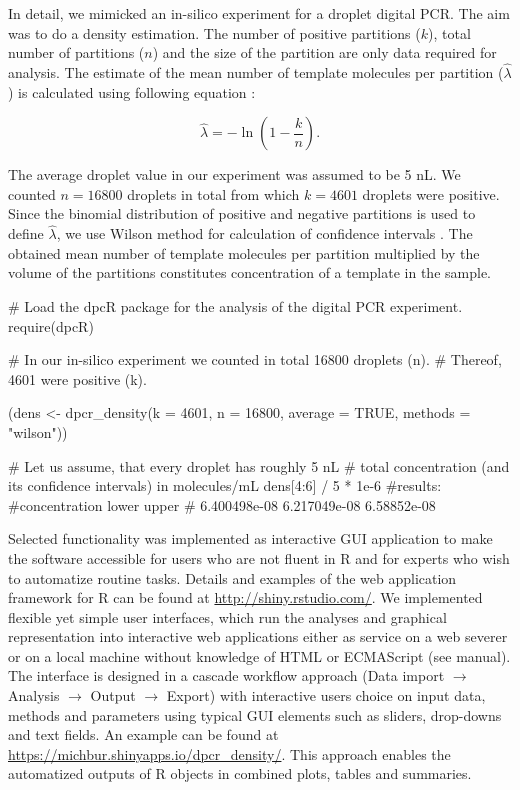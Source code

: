 In detail, we mimicked an in-silico experiment for a droplet digital PCR. The 
aim was to do a density 
estimation. The number of positive partitions ($k$), total number of partitions 
($n$) and 
the size of the partition are only data required for analysis. The estimate of 
the mean number of template molecules per partition ($\hat \lambda$) is 
calculated using following equation \citep{huggett_2013}:

\begin{equation}
\hat{\lambda} =  -\ln{(1 - \frac{k}{n})}.
\end{equation}

The average droplet value in our experiment was assumed to be 5 nL. We counted 
$n = 16800$ droplets in total from which $k = 4601$ droplets were positive. Since the 
binomial distribution of positive and negative partitions is used to define 
$\hat \lambda$, we use Wilson method for calculation of confidence intervals 
\citep{brown_2001}. The obtained mean number of template molecules per 
partition multiplied by the volume of the partitions constitutes concentration of a 
template in the sample.

\begin{example}
# Load the dpcR package for the analysis of the digital PCR experiment.
require(dpcR)

# In our in-silico experiment we counted in total 16800 droplets (n). 
# Thereof, 4601 were positive (k).

(dens <- dpcr_density(k = 4601, n = 16800, average = TRUE, methods = "wilson"))

# Let us assume, that every droplet has roughly 5 nL 
# total concentration (and its confidence intervals) in molecules/mL
dens[4:6] / 5 * 1e-6
#results: 
#concentration        lower       upper
# 6.400498e-08  6.217049e-08 6.58852e-08
\end{example}

Selected functionality was implemented as interactive  GUI 
application to make the software accessible for users who are not fluent in R 
and for experts who wish to automatize routine tasks. Details and examples of 
the  web application framework for R can be found at 
\url{http://shiny.rstudio.com/}. We implemented flexible yet simple user 
interfaces, which run the analyses and graphical representation into 
interactive 
web applications either as service on a web severer or on a local machine 
without knowledge of HTML or ECMAScript (see  manual). The 
interface is designed in a cascade workflow approach (Data import $\rightarrow$ 
Analysis $\rightarrow$ Output $\rightarrow$ Export) with interactive users 
choice on input data, methods and parameters using typical GUI elements such as 
sliders, drop-downs and text fields. An example can be found at 
\url{https://michbur.shinyapps.io/dpcr_density/}. This approach enables the 
automatized outputs of R objects in combined plots, tables and summaries.

